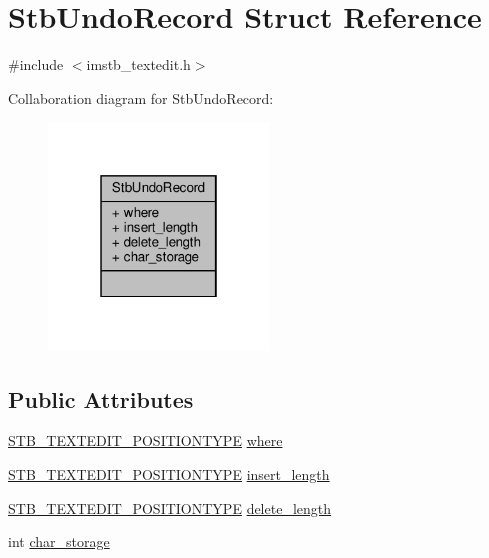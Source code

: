 \hypertarget{structStbUndoRecord}{}\section{Stb\+Undo\+Record Struct Reference}
\label{structStbUndoRecord}


{\ttfamily \#include $<$imstb\+\_\+textedit.\+h$>$}



Collaboration diagram for Stb\+Undo\+Record\+:
\nopagebreak
\begin{figure}[H]
\begin{center}
\leavevmode
\includegraphics[width=166pt]{structStbUndoRecord__coll__graph}
\end{center}
\end{figure}
\subsection*{Public Attributes}
\begin{DoxyCompactItemize}
\item 
\hyperlink{imstb__textedit_8h_a5d0c1b8751b6517e3d817f2a025ed654}{S\+T\+B\+\_\+\+T\+E\+X\+T\+E\+D\+I\+T\+\_\+\+P\+O\+S\+I\+T\+I\+O\+N\+T\+Y\+PE} \hyperlink{structStbUndoRecord_a49e87adbb75a18ffba1f853ac974b31d}{where}
\item 
\hyperlink{imstb__textedit_8h_a5d0c1b8751b6517e3d817f2a025ed654}{S\+T\+B\+\_\+\+T\+E\+X\+T\+E\+D\+I\+T\+\_\+\+P\+O\+S\+I\+T\+I\+O\+N\+T\+Y\+PE} \hyperlink{structStbUndoRecord_a1916780aa21b7be61be2492fda2df9cc}{insert\+\_\+length}
\item 
\hyperlink{imstb__textedit_8h_a5d0c1b8751b6517e3d817f2a025ed654}{S\+T\+B\+\_\+\+T\+E\+X\+T\+E\+D\+I\+T\+\_\+\+P\+O\+S\+I\+T\+I\+O\+N\+T\+Y\+PE} \hyperlink{structStbUndoRecord_a39c1e6f00368b5120114256a17b859cd}{delete\+\_\+length}
\item 
int \hyperlink{structStbUndoRecord_ab317aa50c7a222ece13840a4b65167c0}{char\+\_\+storage}
\end{DoxyCompactItemize}


